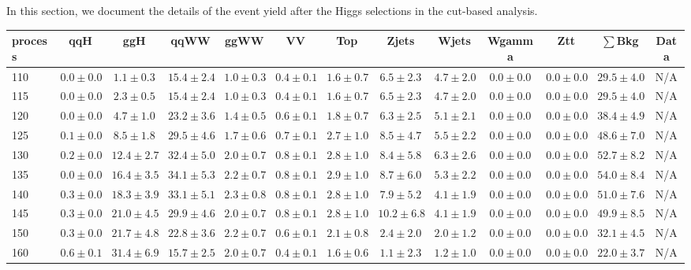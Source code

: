 In this section, we document the details of the event yield after the Higgs 
selections in the cut-based analysis.

\begin{table}
{%
 \tiny
 \begin{center}
 \begin{tabular}{l | c c | c c c c c c c c  | c c}
 \hline
 process & qqH & ggH & qqWW & ggWW & VV & Top & Zjets & Wjets & Wgamma & Ztt & $\sum$Bkg & Data \\
 \hline
110 & $0.0\pm0.0$ & $1.1\pm0.3$ & $15.4\pm2.4$ & $1.0\pm0.3$ & $0.4\pm0.1$ & $1.6\pm0.7$ & $6.5\pm2.3$ & $4.7\pm2.0$ & $0.0\pm0.0$ & $0.0\pm0.0$ & $29.5\pm4.0$ & N/A \\
115 & $0.0\pm0.0$ & $2.3\pm0.5$ & $15.4\pm2.4$ & $1.0\pm0.3$ & $0.4\pm0.1$ & $1.6\pm0.7$ & $6.5\pm2.3$ & $4.7\pm2.0$ & $0.0\pm0.0$ & $0.0\pm0.0$ & $29.5\pm4.0$ & N/A \\
120 & $0.0\pm0.0$ & $4.7\pm1.0$ & $23.2\pm3.6$ & $1.4\pm0.5$ & $0.6\pm0.1$ & $1.8\pm0.7$ & $6.3\pm2.5$ & $5.1\pm2.1$ & $0.0\pm0.0$ & $0.0\pm0.0$ & $38.4\pm4.9$ & N/A \\
125 & $0.1\pm0.0$ & $8.5\pm1.8$ & $29.5\pm4.6$ & $1.7\pm0.6$ & $0.7\pm0.1$ & $2.7\pm1.0$ & $8.5\pm4.7$ & $5.5\pm2.2$ & $0.0\pm0.0$ & $0.0\pm0.0$ & $48.6\pm7.0$ & N/A \\
130 & $0.2\pm0.0$ & $12.4\pm2.7$ & $32.4\pm5.0$ & $2.0\pm0.7$ & $0.8\pm0.1$ & $2.8\pm1.0$ & $8.4\pm5.8$ & $6.3\pm2.6$ & $0.0\pm0.0$ & $0.0\pm0.0$ & $52.7\pm8.2$ & N/A \\
135 & $0.0\pm0.0$ & $16.4\pm3.5$ & $34.1\pm5.3$ & $2.2\pm0.7$ & $0.8\pm0.1$ & $2.9\pm1.0$ & $8.7\pm6.0$ & $5.3\pm2.2$ & $0.0\pm0.0$ & $0.0\pm0.0$ & $54.0\pm8.4$ & N/A \\
140 & $0.3\pm0.0$ & $18.3\pm3.9$ & $33.1\pm5.1$ & $2.3\pm0.8$ & $0.8\pm0.1$ & $2.8\pm1.0$ & $7.9\pm5.2$ & $4.1\pm1.9$ & $0.0\pm0.0$ & $0.0\pm0.0$ & $51.0\pm7.6$ & N/A \\
145 & $0.3\pm0.0$ & $21.0\pm4.5$ & $29.9\pm4.6$ & $2.0\pm0.7$ & $0.8\pm0.1$ & $2.8\pm1.0$ & $10.2\pm6.8$ & $4.1\pm1.9$ & $0.0\pm0.0$ & $0.0\pm0.0$ & $49.9\pm8.5$ & N/A \\
150 & $0.3\pm0.0$ & $21.7\pm4.8$ & $22.8\pm3.6$ & $2.2\pm0.7$ & $0.6\pm0.1$ & $2.1\pm0.8$ & $2.4\pm2.0$ & $2.0\pm1.2$ & $0.0\pm0.0$ & $0.0\pm0.0$ & $32.1\pm4.5$ & N/A \\
160 & $0.6\pm0.1$ & $31.4\pm6.9$ & $15.7\pm2.5$ & $2.0\pm0.7$ & $0.4\pm0.1$ & $1.6\pm0.6$ & $1.1\pm2.3$ & $1.2\pm1.0$ & $0.0\pm0.0$ & $0.0\pm0.0$ & $22.0\pm3.7$ & N/A \\

\end{tabular}
\end{center}}
\end{table}
